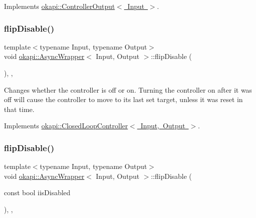 Implements \mbox{\hyperlink{classokapi_1_1ControllerOutput_a360c08f0c10b36f882d6d3100c2cad49}{okapi\+::\+Controller\+Output$<$ Input $>$}}.

\mbox{\label{classokapi_1_1AsyncWrapper_afdf4d80b0f3eec3d77280a561b24f0b0}} 
\subsubsection{\texorpdfstring{flipDisable()}{flipDisable()}\hspace{0.1cm}{\footnotesize\ttfamily [1/2]}}
{\footnotesize\ttfamily template$<$typename Input, typename Output$>$ \\
void \mbox{\hyperlink{classokapi_1_1AsyncWrapper}{okapi\+::\+Async\+Wrapper}}$<$ Input, Output $>$\+::flip\+Disable (\begin{DoxyParamCaption}{ }\end{DoxyParamCaption})\hspace{0.3cm}{\ttfamily [inline]}, {\ttfamily [override]}, {\ttfamily [virtual]}}

Changes whether the controller is off or on. Turning the controller on after it was off will cause the controller to move to its last set target, unless it was reset in that time. 

Implements \mbox{\hyperlink{classokapi_1_1ClosedLoopController_a9de69b60885df41cd2164fe1a23f34d3}{okapi\+::\+Closed\+Loop\+Controller$<$ Input, Output $>$}}.

\mbox{\label{classokapi_1_1AsyncWrapper_ab47f9a7ee52a5d699cb39b21b0926981}} 
\subsubsection{\texorpdfstring{flipDisable()}{flipDisable()}\hspace{0.1cm}{\footnotesize\ttfamily [2/2]}}
{\footnotesize\ttfamily template$<$typename Input, typename Output$>$ \\
void \mbox{\hyperlink{classokapi_1_1AsyncWrapper}{okapi\+::\+Async\+Wrapper}}$<$ Input, Output $>$\+::flip\+Disable (\begin{DoxyParamCaption}\item[{const bool}]{iis\+Disabled }\end{DoxyParamCaption})\hspace{0.3cm}{\ttfamily [inline]}, {\ttfamily [override]}, {\ttfamily [virtual]}}

